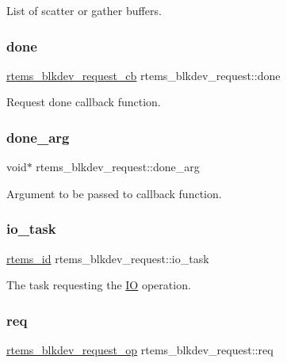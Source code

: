 List of scatter or gather buffers. \mbox{\label{structrtems__blkdev__request_a765728a8a6a087b5b7f0edaefbf4e070}} 
\subsubsection{\texorpdfstring{done}{done}}
{\footnotesize\ttfamily \mbox{\hyperlink{group__rtems__blkdev_ga64a394fd9c40d7e2d1d22441741b6c83}{rtems\+\_\+blkdev\+\_\+request\+\_\+cb}} rtems\+\_\+blkdev\+\_\+request\+::done}

Request done callback function. \mbox{\label{structrtems__blkdev__request_a6d5037a53d9c352883dc7f29880df301}} 
\subsubsection{\texorpdfstring{done\_arg}{done\_arg}}
{\footnotesize\ttfamily void$\ast$ rtems\+\_\+blkdev\+\_\+request\+::done\+\_\+arg}

Argument to be passed to callback function. \mbox{\label{structrtems__blkdev__request_a53d6bb491e03e4282735168860723d2d}} 
\subsubsection{\texorpdfstring{io\_task}{io\_task}}
{\footnotesize\ttfamily \mbox{\hyperlink{group__ClassicTasks_gab20892b814dced7dd4e5b9bf42becd57}{rtems\+\_\+id}} rtems\+\_\+blkdev\+\_\+request\+::io\+\_\+task}

The task requesting the \mbox{\hyperlink{structIO}{IO}} operation. \mbox{\label{structrtems__blkdev__request_a757296b35fdc10cc08c49a555d2873f4}} 
\subsubsection{\texorpdfstring{req}{req}}
{\footnotesize\ttfamily \mbox{\hyperlink{group__rtems__blkdev_ga36465495f1b9e28347838751ca90f0fe}{rtems\+\_\+blkdev\+\_\+request\+\_\+op}} rtems\+\_\+blkdev\+\_\+request\+::req}

